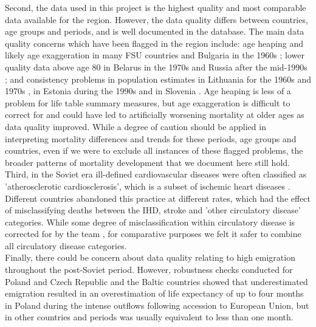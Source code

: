 \documentclass{article}
\begin{document}
\begin{spacing}{1.5}
Second, the \citet{HMD} data used in this project is the highest quality and most comparable data available for the region. However, the data quality differs between countries, age groups and periods, and is well documented in the database. The main data quality concerns which have been flagged in the region include: age heaping and likely age exaggeration in many FSU countries and Bulgaria in the 1960s \citep{grigoriev2017,jasilionis2017Latvia, jdanov2017, pyrozhkov2017, philipov2017}; lower quality data above age 80 in Belarus in the 1970s \citep{grigoriev2017} and Russia after the mid-1990s \citep{jdanov2017}; and consistency problems in population estimates in Lithuania for the 1960s and 1970s \citep{jasilionis2017Lithuania}, in Estonia during the 1990s \citep{jasilionis2017Estonia} and in Slovenia \citep{jasilionis2017Slovenia}. Age heaping is less of a problem for life table summary measures, but age exaggeration is difficult to correct for and could have led to artificially worsening mortality at older ages as data quality improved. While a degree of caution should be applied in interpreting mortality differences and trends for these periods, age groups and countries, even if we were to exclude all instances of these flagged problems, the broader patterns of mortality development that we document here still hold.\\   


Third, in the Soviet era ill-defined cardiovascular diseases were often classified as 'atherosclerotic cardiosclerosis', which is a subset of ischemic heart diseases \citep{jasilionis2011,shkolnikov2012data}. Different countries abandoned this practice at different rates, which had the effect of misclassifying deaths between the IHD, stroke and 'other circulatory disease' categories. While some degree of misclassification within circulatory disease is corrected for by the \citet{HcO} team \citep{Pechholdova2017}, for comparative purposes we felt it safer to combine all circulatory disease categories. \\

Finally, there could be concern about data quality relating to high emigration throughout the post-Soviet period. However, robustness checks conducted for Poland and Czech Republic \citep{Fihel2017} and the Baltic countries \citep{jasilionis2011} showed that underestimated emigration resulted in an overestimation of life expectancy of up to four months in Poland during the intense outflows following accession to European Union, but in other countries and periods was usually equivalent to less than one month.\\



\end{spacing}
\end{document}
